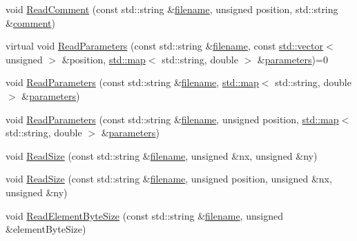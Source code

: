 \begin{DoxyCompactItemize}
\item 
void \hyperlink{class_q_s_t_e_m_1_1_i_data_reader_ac8ebd7cdbd1370e967d4c58da4dc1ff3}{Read\-Comment} (const std\-::string \&\hyperlink{write_fields2_file_8m_af3723aa817dbb65282d5e1db81f08ad8}{filename}, unsigned position, std\-::string \&\hyperlink{image_sim_8m_aea4cc4bd8e43a7f8ebf9b0ee3da8d681}{comment})
\item 
virtual void \hyperlink{class_q_s_t_e_m_1_1_i_data_reader_a13224a229c0383269d032ace270a39c9}{Read\-Parameters} (const std\-::string \&\hyperlink{write_fields2_file_8m_af3723aa817dbb65282d5e1db81f08ad8}{filename}, const \hyperlink{qmb_8m_af54b69a32590de218622e869b06b47b3}{std\-::vector}$<$ unsigned $>$ \&position, \hyperlink{_displacement_params_8m_af619c74fd72bdb64d115463dff2720cd}{std\-::map}$<$ std\-::string, double $>$ \&\hyperlink{sim_image_from_wave_8m_acb6d7970e73c00effe1d16e23142f11d}{parameters})=0
\item 
void \hyperlink{class_q_s_t_e_m_1_1_i_data_reader_ad0b973b1c7f5461ed4ffedae5ad85d4b}{Read\-Parameters} (const std\-::string \&\hyperlink{write_fields2_file_8m_af3723aa817dbb65282d5e1db81f08ad8}{filename}, \hyperlink{_displacement_params_8m_af619c74fd72bdb64d115463dff2720cd}{std\-::map}$<$ std\-::string, double $>$ \&\hyperlink{sim_image_from_wave_8m_acb6d7970e73c00effe1d16e23142f11d}{parameters})
\item 
void \hyperlink{class_q_s_t_e_m_1_1_i_data_reader_ad7c6d83b3621e96263e87f475b0e9a37}{Read\-Parameters} (const std\-::string \&\hyperlink{write_fields2_file_8m_af3723aa817dbb65282d5e1db81f08ad8}{filename}, unsigned position, \hyperlink{_displacement_params_8m_af619c74fd72bdb64d115463dff2720cd}{std\-::map}$<$ std\-::string, double $>$ \&\hyperlink{sim_image_from_wave_8m_acb6d7970e73c00effe1d16e23142f11d}{parameters})
\item 
void \hyperlink{class_q_s_t_e_m_1_1_i_data_reader_a61cc4bb905a6983b5b2ec6a650876c88}{Read\-Size} (const std\-::string \&\hyperlink{write_fields2_file_8m_af3723aa817dbb65282d5e1db81f08ad8}{filename}, unsigned \&nx, unsigned \&ny)
\item 
void \hyperlink{class_q_s_t_e_m_1_1_i_data_reader_ac33378e031385c2d2828cb7326012aef}{Read\-Size} (const std\-::string \&\hyperlink{write_fields2_file_8m_af3723aa817dbb65282d5e1db81f08ad8}{filename}, unsigned position, unsigned \&nx, unsigned \&ny)
\item 
void \hyperlink{class_q_s_t_e_m_1_1_i_data_reader_ac02f75e8e9c8ce2b2200cf254fed09ee}{Read\-Element\-Byte\-Size} (const std\-::string \&\hyperlink{write_fields2_file_8m_af3723aa817dbb65282d5e1db81f08ad8}{filename}, unsigned \&element\-Byte\-Size)

\end{DoxyCompactItemize}
